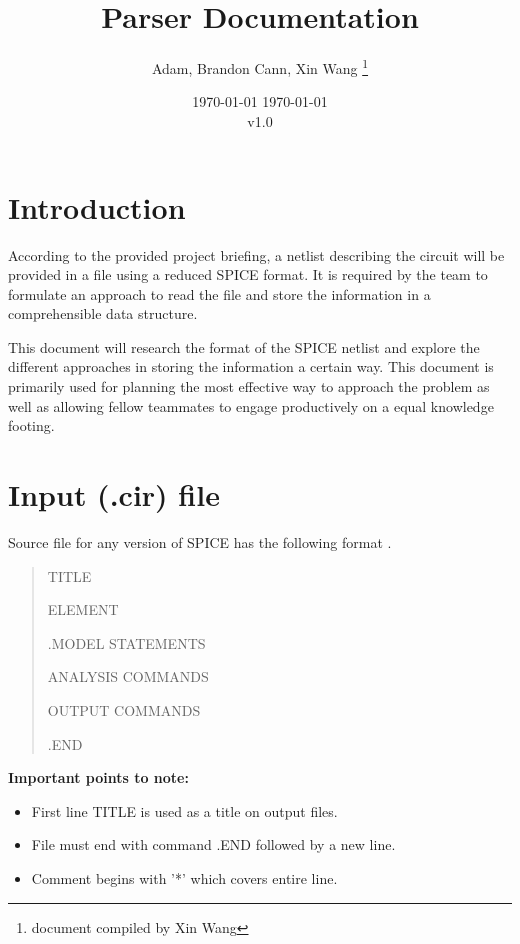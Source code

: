 \documentclass[a4paper, titlepage]{article}
\title{Parser Documentation}
\author{Adam, Brandon Cann, Xin Wang \thanks{document compiled by Xin Wang}}
\date \today
\date{ \today \\ v1.0}
\begin{document}
    \maketitle
    
    \tableofcontents
    \pagebreak
 
    \section{Introduction}
    \indent
    According to the provided project briefing, a netlist describing the circuit will be provided in a file using a reduced SPICE format. It is required by the team to formulate an approach to read the file and store the information in a comprehensible data structure. 
    \par
    This document will research the format of the SPICE netlist and explore the different approaches in storing the information a certain way. This document is primarily used for planning the most effective way to approach the problem
    as well as allowing fellow teammates to engage productively on a equal knowledge footing. 
    \section{Input (.cir) file}
    Source file for any version of SPICE has the following format \cite{spice}.
    \begin{quotation}
        {\selectfont
            TITLE \par
            ELEMENT \par
            .MODEL STATEMENTS \par
            ANALYSIS COMMANDS \par
            OUTPUT COMMANDS \par
            .END \par
        }
    \end{quotation}

    \textbf{Important points to note:}
    \begin{itemize}
        \item First line {\selectfont TITLE } is used as a title on output files.
        \item File must end with command {\selectfont .END} followed by a new line.
        \item Comment begins with '*' which covers entire line.
    \end{itemize}
\end{document}

